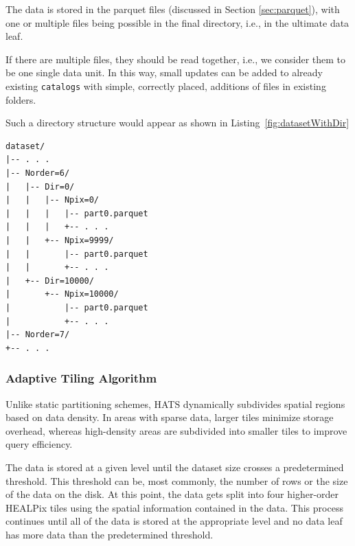 \documentclass[11pt,a4paper]{ivoa}
\begin{document}
The data is stored in the parquet files (discussed in Section \ref{sec:parquet}), with one or multiple files being possible in the final directory, i.e., in the ultimate data leaf.  \par 
If there are multiple files, they should be read together, i.e., we consider them to be one single data unit. 
In this way, small updates can be added to already existing  \texttt{catalogs} with simple, correctly placed, additions of files in existing folders.

Such a directory structure would appear as shown in Listing~\ref{fig:datasetWithDir}

\begin{minipage}{\linewidth}
\begin{lstlisting}[caption=Example catalog dataset directory contents with leaf directories, label=fig:datasetWithDir]
dataset/
|-- . . .
|-- Norder=6/
|   |-- Dir=0/
|   |   |-- Npix=0/
|   |   |   |-- part0.parquet
|   |   |   +-- . . .
|   |   +-- Npix=9999/
|   |       |-- part0.parquet
|   |       +-- . . .
|   +-- Dir=10000/
|       +-- Npix=10000/
|           |-- part0.parquet
|           +-- . . .
|-- Norder=7/
+-- . . .
\end{lstlisting} 
\end{minipage} 

    \subsubsection{Adaptive Tiling Algorithm} \label{sec:adaptive}
    Unlike static partitioning schemes, HATS dynamically subdivides spatial regions based on data density. In areas with sparse data, larger tiles minimize storage overhead, whereas high-density areas are subdivided into smaller tiles to improve query efficiency. \par
	The data is stored at a given level until the dataset size crosses a predetermined threshold. This threshold can be, most commonly, the number of rows or the size of the data on the disk. At this point, the data gets split into four higher-order HEALPix tiles using the spatial information contained in the data. This process continues until all of the data is stored at the appropriate level and no data leaf has more data than the predetermined threshold.
\end{document}
